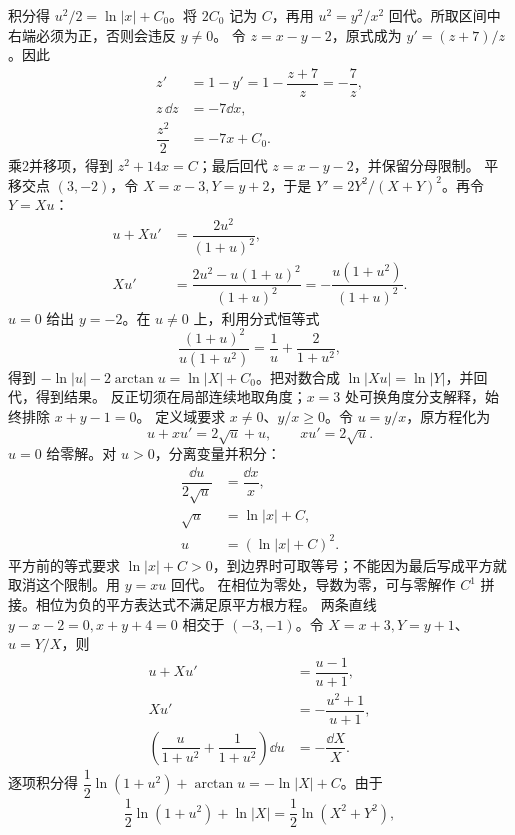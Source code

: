 积分得 $u^2/2=\ln|x|+C_0$。将 $2C_0$ 记为 $C$，再用 $u^2=y^2/x^2$ 回代。所取区间中右端必须为正，否则会违反 $y\ne0$。
令 $z=x-y-2$，原式成为 $y'=(z+7)/z$。因此
\[
\begin{aligned}
z'&=1-y'=1-\dfrac{z+7}{z}=-\dfrac7z,\\
z\,\dd z&=-7\dd x,\\
\dfrac{z^2}{2}&=-7x+C_0.
\end{aligned}
\]
乘2并移项，得到 $z^2+14x=C$；最后回代 $z=x-y-2$，并保留分母限制。
平移交点 $(3,-2)$，令 $X=x-3,Y=y+2$，于是 $Y'=2Y^2/(X+Y)^2$。再令 $Y=Xu$：
\[
\begin{aligned}
u+Xu'&=\dfrac{2u^2}{(1+u)^2},\\
Xu'&=\dfrac{2u^2-u(1+u)^2}{(1+u)^2}
=-\dfrac{u(1+u^2)}{(1+u)^2}.
\end{aligned}
\]
$u=0$ 给出 $y=-2$。在 $u\ne0$ 上，利用分式恒等式
\[
\dfrac{(1+u)^2}{u(1+u^2)}=\dfrac1u+\dfrac2{1+u^2},
\]
得到 $-\ln|u|-2\arctan u=\ln|X|+C_0$。把对数合成 $\ln|Xu|=\ln|Y|$，并回代，得到结果。
反正切须在局部连续地取角度；$x=3$ 处可换角度分支解释，始终排除 $x+y-1=0$。
定义域要求 $x\ne0$、$y/x\ge0$。令 $u=y/x$，原方程化为
\[
u+xu'=2\sqrt u+u,\qquad xu'=2\sqrt u.
\]
$u=0$ 给零解。对 $u>0$，分离变量并积分：
\[
\begin{aligned}
\dfrac{\dd u}{2\sqrt u}&=\dfrac{\dd x}x,\\
\sqrt u&=\ln|x|+C,\\
u&=(\ln|x|+C)^2.
\end{aligned}
\]
平方前的等式要求 $\ln|x|+C>0$，到边界时可取等号；不能因为最后写成平方就取消这个限制。用 $y=xu$ 回代。
在相位为零处，导数为零，可与零解作 $C^1$ 拼接。相位为负的平方表达式不满足原平方根方程。
两条直线 $y-x-2=0,x+y+4=0$ 相交于 $(-3,-1)$。令 $X=x+3,Y=y+1$、$u=Y/X$，则
\[
\begin{aligned}
u+Xu'&=\dfrac{u-1}{u+1},\\
Xu'&=-\dfrac{u^2+1}{u+1},\\
\left(\dfrac{u}{1+u^2}+\dfrac1{1+u^2}\right)\dd u&=-\dfrac{\dd X}X.
\end{aligned}
\]
逐项积分得 $\dfrac12\ln(1+u^2)+\arctan u=-\ln|X|+C$。由于
\[
\dfrac12\ln(1+u^2)+\ln|X|=\dfrac12\ln(X^2+Y^2),
\]
